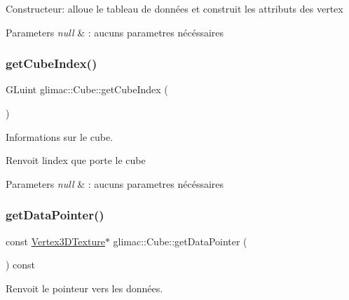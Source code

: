 Constructeur\+: alloue le tableau de données et construit les attributs des vertex


\begin{DoxyParams}{Parameters}
{\em null} & \+: aucuns parametres nécéssaires \\
\hline
\end{DoxyParams}
\mbox{\label{classglimac_1_1Cube_a44474e1c5c5c77118922294f63f553f5}} 
\subsubsection{\texorpdfstring{get\+Cube\+Index()}{getCubeIndex()}}
{\footnotesize\ttfamily G\+Luint glimac\+::\+Cube\+::get\+Cube\+Index (\begin{DoxyParamCaption}{ }\end{DoxyParamCaption})\hspace{0.3cm}{\ttfamily [inline]}}



Informations sur le cube. 

Renvoit l\textquotesingle{}index que porte le cube


\begin{DoxyParams}{Parameters}
{\em null} & \+: aucuns parametres nécéssaires \\
\hline
\end{DoxyParams}
\mbox{\label{classglimac_1_1Cube_a29357c655008183dacf647cb3c6fcb12}} 
\subsubsection{\texorpdfstring{get\+Data\+Pointer()}{getDataPointer()}}
{\footnotesize\ttfamily const \hyperlink{structglimac_1_1Vertex3DTexture}{Vertex3\+D\+Texture}$\ast$ glimac\+::\+Cube\+::get\+Data\+Pointer (\begin{DoxyParamCaption}{ }\end{DoxyParamCaption}) const\hspace{0.3cm}{\ttfamily [inline]}}



Renvoit le pointeur vers les données. 

